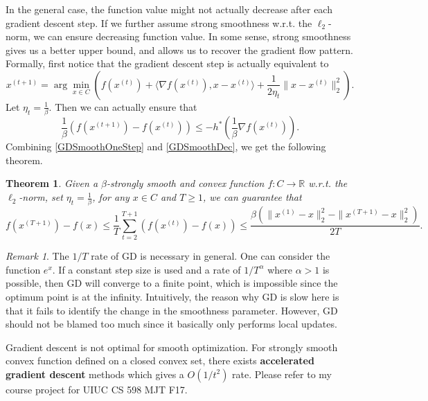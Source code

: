 \documentclass[openany]{book}
\newtheorem{theorem}{Theorem}[chapter]
\theoremstyle{definition}
\theoremstyle{remark}
\newtheorem*{remark}{Remark}
\begin{document}
In the general case, the function value might not actually decrease after each gradient descent step. If we further assume strong smoothness w.r.t. the $\ell_2$-norm, we can ensure decreasing function value. In some sense, strong smoothness gives us a better upper bound, and allows us to recover the gradient flow pattern. Formally, first notice that the gradient descent step is actually equivalent to
\begin{equation}\label{quadApprox}
    x^{(t+1)}=\arg\min_{x\in C}\left(f(x^{(t)})+\langle\nabla f(x^{(t)}),x-x^{(t)}\rangle+\frac{1}{2\eta_t}\|x-x^{(t)}\|_2^2\right).
\end{equation}
Let $\eta_t=\frac{1}{\beta}$. Then we can actually ensure that
\begin{equation}\label{GDSmoothDec}
    \frac{1}{\beta}\left(f(x^{(t+1)})-f(x^{(t)})\right)\le-h^*\left(\frac{1}{\beta}\nabla f(x^{(t)})\right).
\end{equation}
Combining \eqref{GDSmoothOneStep} and \eqref{GDSmoothDec}, we get the following theorem.
\begin{theorem}
    Given a $\beta$-strongly smooth and convex function $f:C\to \mathbb{R}$ w.r.t. the $\ell_2$-norm, set $\eta_t=\frac{1}{\beta}$, for any $x\in C$ and $T\ge1$, we can guarantee that
    \begin{equation*}
        f(x^{(T+1)})-f(x)\le\frac{1}{T}\sum_{t=2}^{T+1}\left(f(x^{(t)})-f(x)\right)\le \frac{\beta\left(\|x^{(1)}-x\|_2^2-\|x^{(T+1)}-x\|_2^2\right)}{2T}.
    \end{equation*}
\end{theorem}

\begin{remark}
    The $1/T$ rate of GD is necessary in general. One can consider the function $e^x$. If a constant step size is used and a rate of $1/T^{\alpha}$ where $\alpha>1$ is possible, then GD will converge to a finite point, which is impossible since the optimum point is at the infinity. Intuitively, the reason why GD is slow here is that it fails to identify the change in the smoothness parameter. However, GD should not be blamed too much since it basically only performs local updates.
\end{remark}

Gradient descent is not optimal for smooth optimization. For strongly smooth convex function defined on a closed convex set, there exists \textbf{accelerated gradient descent} methods which gives a $O(1/t^2)$ rate. Please refer to my course project for UIUC CS 598 MJT F17.
\end{document}
